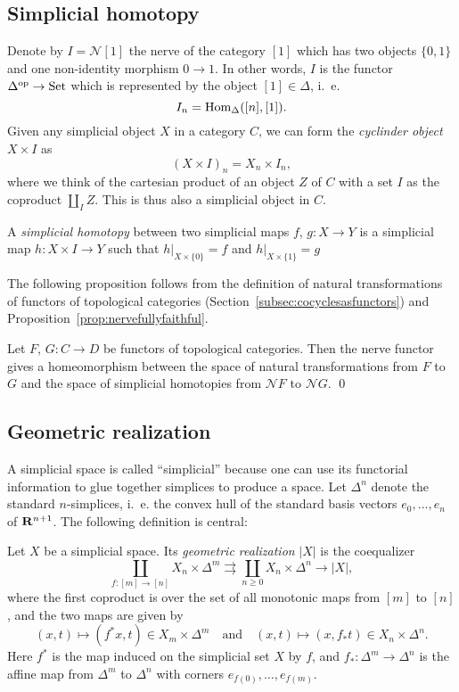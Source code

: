 \documentclass[a4paper,openany]{scrbook}
\newcommand{\nerve}{\mathcal N}
\begin{document}
\subsection{Simplicial homotopy}\label{subsec:simplicial-homotopy}

Denote by $I=\nerve [1]$ the nerve of the category $[1]$ which has two objects $\{0,1\}$ and one non-identity morphism $0 \to 1$. In other words, $I$ is the functor $\Delta^{\operatorname{op}}\to\operatorname{Set}$ which is represented by the object $[1] \in \Delta$, i.~e.
\[
I_n = \operatorname{Hom}_{\Delta}([n],[1]).
\]
Given any simplicial object $X$ in a category $C$, we can form the \emph{cyclinder object} $X \times I$ as
\[
(X \times I)_n = X_n \times I_n,
\]
where we think of the cartesian product of an object $Z$ of $C$ with a set $I$ as the coproduct $\coprod_I Z$. This is thus also a simplicial object in $C$.

\begin{defn}
A \emph{simplicial homotopy} between two simplicial maps $f$, $g\colon X \to Y$ is a simplicial map $h\colon X \times I \to Y$ such that $h|_{X \times \{0\}} = f$ and $h|_{X \times \{1\}} = g$
\end{defn}

The following proposition follows from the definition of natural transformations of functors of topological categories (Section~\ref{subsec:cocyclesasfunctors}) and Proposition~\ref{prop:nervefullyfaithful}.

\begin{prop}
Let $F$, $G\colon C \to D$ be functors of topological categories. Then the nerve functor gives a homeomorphism between the space of natural transformations from $F$ to $G$ and the space of simplicial homotopies from $\nerve F$ to $\nerve G$. \qed
\end{prop}

\subsection{Geometric realization}\label{subsec:geometric-realization}

A simplicial space is called “simplicial” because one can use its functorial information to glue together simplices to produce a space. Let $\Delta^n$ denote the standard $n$-simplices, i.~e. the convex hull of the standard basis vectors $e_0,\dots,e_n$ of $\mathbf R^{n+1}$. The following definition is central:

\begin{defn}
Let $X$ be a simplicial space. Its \emph{geometric realization} $|X|$ is the coequalizer
\[
\coprod_{f\colon [m] \to [n]} X_n \times \Delta^m \rightrightarrows \coprod_{n \geq 0} X_n \times \Delta^n \to |X|,
\]
where the first coproduct is over the set of all monotonic maps from $[m]$ to $[n]$, and the two maps are given by
\[
(x,t) \mapsto (f^*x,t) \in X_m \times \Delta^m \quad \text{and} \quad (x,t) \mapsto (x,f_*t) \in X_n \times \Delta^n.
\]
Here $f^*$ is the map induced on the simplicial set $X$ by $f$, and $f_*\colon \Delta^m \to \Delta^n$ is the affine map from $\Delta^m$ to $\Delta^n$ with corners $e_{f(0)},\dots,e_{f(m)}$.
\end{defn}
\end{document}
